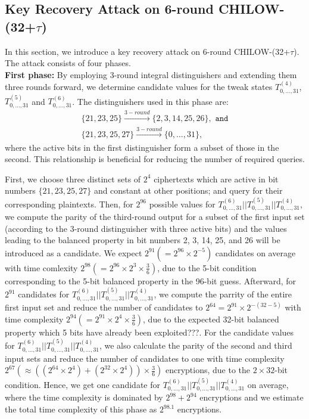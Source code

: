 \documentclass[a4paper]{llncs}
\begin{document}
\subsection{Key Recovery Attack on 6-round CHILOW-(32+$\tau$)}
\label{sec:6R-attack}

In this section, we introduce a key recovery attack on 6-round CHILOW-(32+$\tau$). The attack consists of four phases. \\

\textbf{First phase:} By employing 3-round integral distinguishers and extending them three rounds forward, we determine candidate values for the tweak states $T^{(4)}_{0,...,31}$, $T^{(5)}_{0,...,31}$ and $T^{(6)}_{0,...,31}$. The distinguishers used in this phase are:
\begin{equation*}
\begin{split}
\{21,23,25\}\xrightarrow{3-round}\{2,3,14,25,26\}, \texttt{ and}\\
\{21,23,25,27\}\xrightarrow{3-round}\{0,...,31\},
\end{split}
\end{equation*}
where the active bits in the first distinguisher form a subset of those in the second. This relationship is beneficial for reducing the number of required queries.

First, we choose three distinct sets of $2^{4}$ ciphertexts which are active in bit numbers $\{21,23,25,27\}$ and constant at other positions; and query for their corresponding plaintexts. Then, for $2^{96}$ possible values for $T^{(6)}_{0,...,31}||T^{(5)}_{0,...,31}||T^{(4)}_{0,...,31}$, we compute the parity of the third-round output for a subset of the first input set (according to the 3-round distinguisher with three active bits) and the values leading to the balanced property in bit numbers 2, 3, 14, 25, and 26 will be introduced as a candidate. We expect $2^{91}(=2^{96}\times 2^{-5})$ candidates on average with time comlexity $2^{98}(=2^{96}\times 2^{3}\times \frac{3}{6})$, due to the 5-bit condition corresponding to the 5-bit balanced property in the 96-bit guess. Afterward, for $2^{91}$ candidates for $T^{(6)}_{0,...,31}||T^{(5)}_{0,...,31}||T^{(4)}_{0,...,31}$, we compute the parrity of the entire first input set and reduce the number of candidates to $2^{64}=2^{91}\times2^{-(32-5)}$ with time complexity $2^{94}(=2^{91}\times 2^{4}\times \frac{3}{6})$, due to the expected 32-bit balanced property which 5 bits have already been exploited{\color{red}???}. For the candidate values for $T^{(6)}_{0,...,31}||T^{(5)}_{0,...,31}||T^{(4)}_{0,...,31}$, we also calculate the parity of the second and third input sets and reduce the number of candidates to one with time complexity $2^{67}(\approx ((2^{64}\times 2^{4})+(2^{32}\times 2^{4})) \times \frac{3}{6})$ encryptions, due to the $2\times 32$-bit condition. Hence, we get one candidate for $T^{(6)}_{0,...,31}||T^{(5)}_{0,...,31}||T^{(4)}_{0,...,31}$ on average, where the time complexity is dominated by $2^{98}+2^{94}$ encryptions and we estimate the total time complexity of this phase as $2^{98.1}$ encryptions.\\
\end{document}
